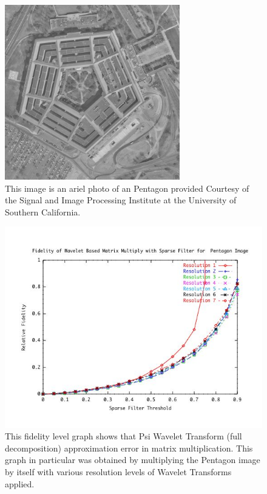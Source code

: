 \begin{figure}
\includegraphics [width=3in]{pentagon.jpg}
\caption{This image is an ariel photo of an Pentagon provided Courtesy of the Signal and Image Processing Institute at the University of Southern California.  \cite{pentagon}}
\label{image fishingboat}
\end{figure}

\begin{figure}
\includegraphics [width=5.5in]{pentagonresultsA.jpg}
\caption{This fidelity level graph shows that Psi Wavelet Transform (full decomposition) approximation error in matrix multiplication.  This graph in particular was obtained by multiplying the Pentagon image by itself with various resolution levels of Wavelet Transforms applied. \cite{Pentagon} }
\label{image_pentagon_fidelity}
\end{figure}

